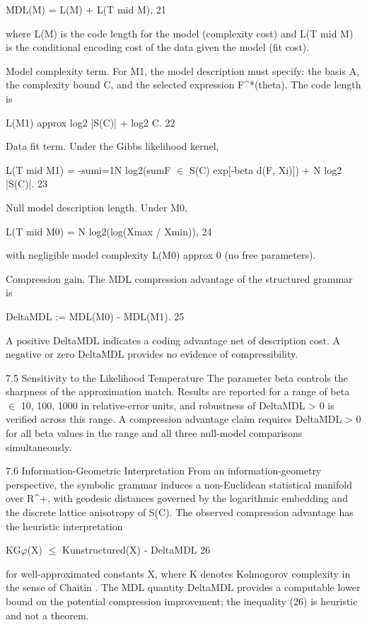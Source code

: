   MDL(M) = L(M) + L(T mid M), 21

  where L(M) is the code length for the model (complexity cost) and L(T mid M) is the
  conditional encoding cost of the data given the model (fit cost).

  Model complexity term. For M1, the model description must specify: the basis A, the
  complexity bound C, and the selected expression F^*(theta). The code length is

  L(M1) approx log2 |S(C)| + log2 C. 22

  Data fit term. Under the Gibbs likelihood kernel,

  L(T mid M1) = -sumi=1N log2(sumF $\in$ S(C) exp[-beta d(F, Xi)]) + N log2 |S(C)|. 23

  Null model description length. Under M0,

  L(T mid M0) = N log2(log(Xmax / Xmin)), 24

  with negligible model complexity L(M0) approx 0 (no free parameters).

  Compression gain. The MDL compression advantage of the structured grammar is

  DeltaMDL := MDL(M0) - MDL(M1). 25

  A positive DeltaMDL indicates a coding advantage net of description cost. A negative or
  zero DeltaMDL provides no evidence of compressibility.

  7.5 Sensitivity to the Likelihood Temperature
  The parameter beta controls the sharpness of the approximation match. Results are
  reported for a range of beta $\in$ {10, 100, 1000} in relative-error units, and robustness of
  DeltaMDL > 0 is verified across this range. A compression advantage claim requires
  DeltaMDL > 0 for all beta values in the range and all three null-model comparisons
  simultaneously.

  7.6 Information-Geometric Interpretation
  From an information-geometry perspective, the symbolic grammar induces a
  non-Euclidean statistical manifold over R^+, with geodesic distances governed by the
  logarithmic embedding and the discrete lattice anisotropy of S(C). The observed
  compression advantage has the heuristic interpretation

  KG$\varphi$(X) $\leq$ Kunstructured(X) - DeltaMDL 26

  for well-approximated constants X, where K denotes Kolmogorov complexity in the
  sense of Chaitin \citep{chaitin1987}. The MDL quantity DeltaMDL provides a computable lower
  bound on the potential compression improvement; the inequality (26) is heuristic and
  not a theorem.


